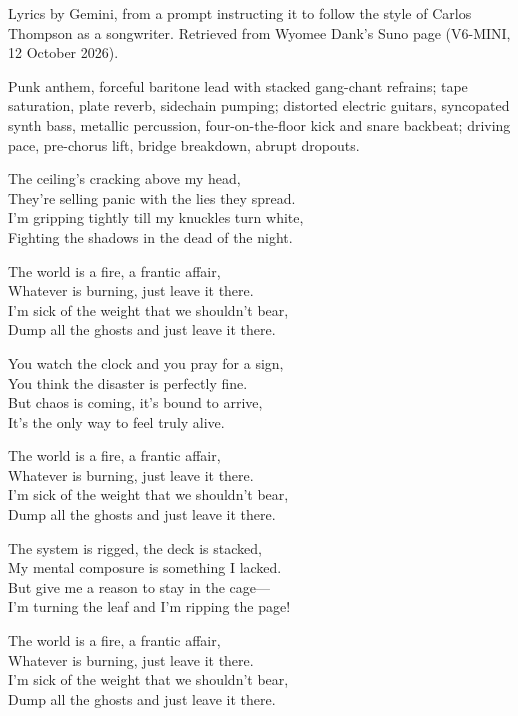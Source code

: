 
\begin{notes}
Lyrics by Gemini, from a prompt instructing it to follow the style of Carlos Thompson as a songwriter. Retrieved from Wyomee Dank's Suno page (V6-MINI, 12 October 2026).
\end{notes}
\begin{style}
Punk anthem, forceful baritone lead with stacked gang-chant refrains; tape saturation, plate reverb, sidechain pumping; distorted electric guitars, syncopated synth bass, metallic percussion, four-on-the-floor kick and snare backbeat; driving pace, pre-chorus lift, bridge breakdown, abrupt dropouts.
\end{style}
\begin{lyrics}
The ceiling's cracking above my head,\\
They're selling panic with the lies they spread.\\
I'm gripping tightly till my knuckles turn white,\\
Fighting the shadows in the dead of the night.

The world is a fire, a frantic affair,\\
Whatever is burning, just leave it there.\\
I'm sick of the weight that we shouldn't bear,\\
Dump all the ghosts and just leave it there.

You watch the clock and you pray for a sign,\\
You think the disaster is perfectly fine.\\
But chaos is coming, it's bound to arrive,\\
It's the only way to feel truly alive.

The world is a fire, a frantic affair,\\
Whatever is burning, just leave it there.\\
I'm sick of the weight that we shouldn't bear,\\
Dump all the ghosts and just leave it there.

The system is rigged, the deck is stacked,\\
My mental composure is something I lacked.\\
But give me a reason to stay in the cage—\\
I'm turning the leaf and I'm ripping the page!

The world is a fire, a frantic affair,\\
Whatever is burning, just leave it there.\\
I'm sick of the weight that we shouldn't bear,\\
Dump all the ghosts and just leave it there.
\end{lyrics}

